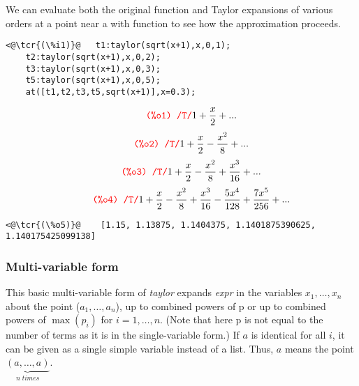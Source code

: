 \documentclass[../Maxima_Workbook.tex]{subfiles}
\begin{document}
\lz We can evaluate both the original function and Taylor expansions of various orders at a point near a with function  to see how the approximation proceeds.

\lz \begin{small}
\color{blue} \leqn
\begin{lstlisting}
<@\tcr{(\%i1)}@   t1:taylor(sqrt(x+1),x,0,1);
	t2:taylor(sqrt(x+1),x,0,2); 
	t3:taylor(sqrt(x+1),x,0,3); 
	t5:taylor(sqrt(x+1),x,0,5);
	at([t1,t2,t3,t5,sqrt(x+1)],x=0.3);
\end{lstlisting}
\vspace{-4mm} \[ \tag*{\tcr{\ttfamily (\%o1) /T/}} 1+\frac{x}{2}+\mbox{...} \]
\vspace{-6mm} \[ \tag*{\tcr{\ttfamily (\%o2) /T/}} 1+\frac{x}{2}-\frac{{{x}^{2}}}{8}+\mbox{...} \]
\vspace{-6mm} \[ \tag*{\tcr{\ttfamily (\%o3) /T/}} 1+\frac{x}{2}-\frac{{{x}^{2}}}{8}+\frac{{{x}^{3}}}{16}+\mbox{...} \]
\vspace{-6mm} \[ \tag*{\tcr{\ttfamily (\%o4) /T/}} 1+\frac{x}{2}-\frac{{{x}^{2}}}{8}+\frac{{{x}^{3}}}{16}-\frac{5 {{x}^{4}}}{128}+\frac{7 {{x}^{5}}}{256}+\mbox{...} \]
\vspace{-5mm} \begin{lstlisting}
<@\tcr{(\%o5)}@    [1.15, 1.13875, 1.1404375, 1.1401875390625, 1.140175425099138]
\end{lstlisting}
\color{black} \reqn
\end{small} \vspace{-2mm} 

\subsubsection{Multi-variable form}

\lz {}

\lz This basic multi-variable form of \emph{taylor} expands \emph{expr} in the variables $ x_1, \dots,x_n $ about the point ($ a_1,\dots,a_n $), up to combined powers of p or up to combined powers of $ \max (p_i) $ for $ i=1,\dots,n $. (Note that here p is not equal to the number of terms as it is in the single-variable form.) If $ a $ is identical for all $ i $, it can be given as a single simple variable instead of a list. Thus, $ a $ means the point $ \underbrace{(a, \dots, a)}_{n \; times} $.

\lzz {}
\end{document}
